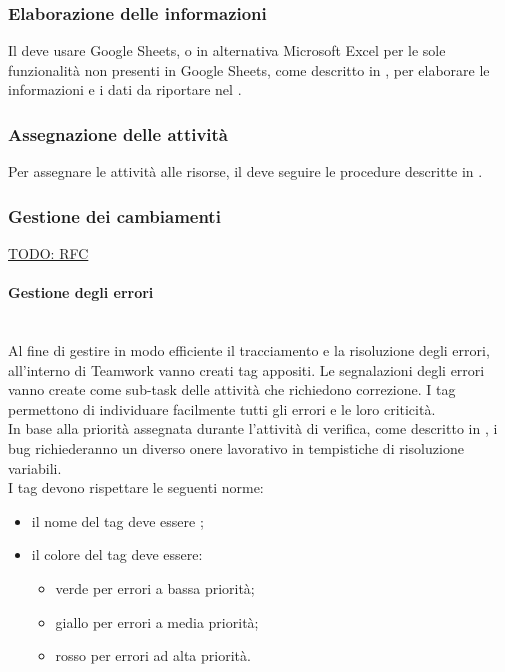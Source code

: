 \subsubsection{Elaborazione delle informazioni}
Il \Responsabile{} deve usare Google Sheets, o in alternativa Microsoft Excel per le sole funzionalità non presenti in Google Sheets, come descritto in , per elaborare le informazioni e i dati da riportare nel \PianoDiProgetto.

\subsubsection{Assegnazione delle attività}
Per assegnare le attività alle risorse, il \Responsabile deve seguire le procedure descritte in .

\subsubsection{Gestione dei cambiamenti}
\underline{TODO: RFC}

\paragraph{Gestione degli errori} \mbox{} \\
Al fine di gestire in modo efficiente il tracciamento e la risoluzione degli errori, all'interno di Teamwork vanno creati tag appositi.
Le segnalazioni degli errori vanno create come sub-task delle attività che richiedono correzione. I tag permettono di individuare facilmente tutti gli errori e le loro criticità. \\
In base alla priorità assegnata durante l'attività di verifica, come descritto in \PianoDiQualifica, i bug richiederanno un diverso onere lavorativo in tempistiche di risoluzione variabili.\\
I tag devono rispettare le seguenti norme:
\begin{itemize}
	\item il nome del tag deve essere ;
	\item il colore del tag deve essere:
	\begin{itemize}
		\item verde per errori a bassa priorità;
		\item giallo per errori a media priorità;
		\item rosso per errori ad alta priorità.
	\end{itemize}
\end{itemize}

